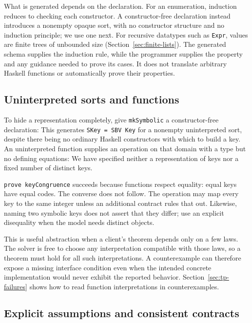 \documentclass[review]{jfp-epi}
\newcommand{\code}[1]{\texttt{#1}}
\begin{document}
What is generated depends on the declaration. For an enumeration, induction
reduces to checking each constructor. A constructor-free declaration instead
introduces a nonempty opaque sort, with no constructor structure and no induction
principle; we use one next. For recursive datatypes such as \code{Expr}, values
are finite trees of unbounded size (Section~\ref{sec:finite-lists}). The generated
schema supplies the induction rule, while the programmer supplies the property
and any guidance needed to prove its cases. It does not translate arbitrary
Haskell functions or automatically prove their properties.


\subsection{Uninterpreted sorts and functions}
\label{sec:uninterpreted-models}

To hide a representation completely, give \code{mkSymbolic} a constructor-free
declaration:
This generates \code{SKey = SBV Key} for a nonempty uninterpreted sort, despite
there being no ordinary Haskell constructors with which to build a key.
An uninterpreted function supplies an operation on that domain with a type but
no defining equations:
We have specified neither a representation of keys nor a fixed number of
distinct keys.

\code{prove keyCongruence} succeeds because functions respect equality:
equal keys have equal codes. The converse does not follow. The operation may
map every key to the same integer unless an additional contract rules that out.
Likewise, naming two symbolic keys does not assert that they differ; use an
explicit disequality when the model needs distinct objects.

This is useful abstraction when a client's theorem depends only on a few laws.
The solver is free to choose any interpretation compatible with those laws,
so a theorem must hold for all such interpretations. A counterexample can
therefore expose a missing interface condition even when the intended concrete
implementation would never exhibit the reported behavior. Section~\ref{sec:tp-failures}
shows how to read function interpretations in counterexamples.


\subsection{Explicit assumptions and consistent contracts}
\label{sec:consistent-contracts}
\end{document}
